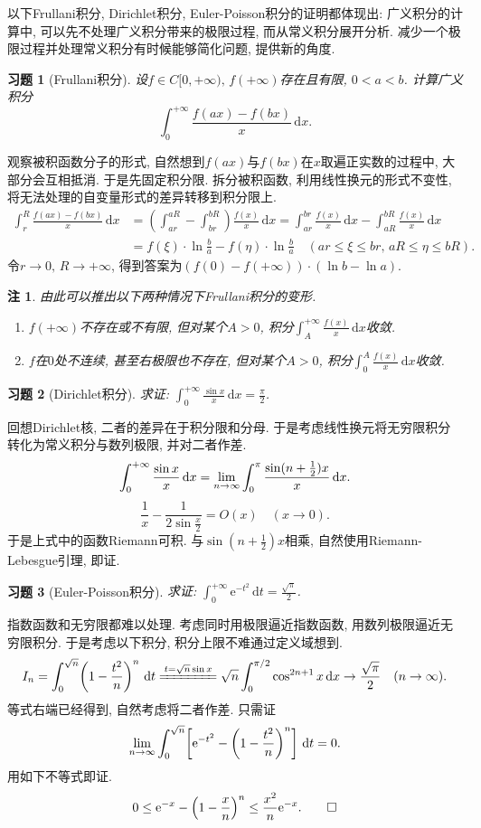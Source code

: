 \documentclass[11pt,a4paper]{ctexart}
\makeatletter
\theoremstyle{thmseries} %
\theoremstyle{exerseries}
\newtheorem{exer}{习题}[section]
\newtheorem*{rem}{注}
\renewenvironment{proof}[1][\proofname]{\par
  \pushQED{\qed}%
  \normalfont \topsep6\p@\@plus6\p@\relax
  \trivlist
  \item[\hskip\labelsep
        \itshape
    #1\@addpunct{}]\ignorespaces
}{%
  \popQED\endtrivlist\@endpefalse
}
\newenvironment{sol}{\begin{proof}[\bfseries\upshape 解\quad]}{\end{proof}}
\newenvironment{pf}{\begin{proof}[\bfseries\upshape 证\quad]}{\end{proof}}
\newcommand{\bra}[1]{\mathopen{}\left(#1\right)}
\newcommand{\sbra}[1]{\mathopen{}\left[#1\right]}
\renewcommand{\d}{\mathrm{d}}
\newcommand{\e}{\mathrm{e}}
\def \nti {\mathnormal{n}\to\infty}
\makeatother
\begin{document}
以下Frullani积分, Dirichlet积分, Euler-Poisson积分的证明都体现出: 广义积分的计算中, 可以先不处理广义积分带来的极限过程, 而从常义积分展开分析. 减少一个极限过程并处理常义积分有时候能够简化问题, 提供新的角度. 
\begin{exer}[Frullani积分]
	设$f\in C[0,+\infty),\,f(+\infty)$存在且有限, $0<a<b$. 计算广义积分
	\[\int_{0}^{+\infty}\frac{f(ax)-f(bx)}{x}\,\d x.\]
\end{exer}
\begin{sol}
	观察被积函数分子的形式, 自然想到$f(ax)$与$f(bx)$在$x$取遍正实数的过程中, 大部分会互相抵消. 于是先固定积分限. 拆分被积函数, 利用线性换元的形式不变性, 将无法处理的自变量形式的差异转移到积分限上. 
	\begin{align*}
		\int_{r}^{R}\frac{f(ax)-f(bx)}{x}\,\d x&=\bra{\int_{ar}^{aR}-\int_{br}^{bR}}\frac{f(x)}{x}\,\d x=\int_{ar}^{br}\frac{f(x)}{x}\,\d x-\int_{aR}^{bR}\frac{f(x)}{x}\,\d x\\
		&=f(\xi)\cdot\ln\frac{b}{a}-f(\eta)\cdot\ln\frac{b}{a}\quad (ar\leq\xi\leq br,\,aR\leq\eta\leq bR).
	\end{align*}
	令$r\to0,\,R\to+\infty$, 得到答案为$\bra{f(0)-f(+\infty)}\cdot(\ln b-\ln a)$. 
\end{sol}
\begin{rem}
	由此可以推出以下两种情况下Frullani积分的变形. 
	\begin{enumerate}
		\item $f(+\infty)$不存在或不有限, 但对某个$A>0$, 积分$\int_{A}^{+\infty}\frac{f(x)}{x}\,\d x$收敛. 
		\item $f$在$0$处不连续, 甚至右极限也不存在, 但对某个$A>0$, 积分$\int_{0}^{A}\frac{f(x)}{x}\,\d x$收敛. 
	\end{enumerate}
\end{rem}

\begin{exer}[Dirichlet积分]
	求证: $\int_{0}^{+\infty}\frac{\sin x}{x}\,\d x=\frac{\pi}{2}$. 
\end{exer}
\begin{pf}
	回想Dirichlet核, 二者的差异在于积分限和分母. 于是考虑线性换元将无穷限积分转化为常义积分与数列极限, 并对二者作差. 
	\[\int_{0}^{+\infty}\frac{\sin x}{x}\,\d x=\lim_{\nti}\int_{0}^{\pi}\frac{\sin(n+\frac{1}{2})x}{x}\,\d x.\]
	\[\frac{1}{x}-\frac{1}{2\sin\frac{x}{2}}=O(x)\quad(x\to0).\]
	于是上式中的函数Riemann可积. 与$\sin(n+\frac{1}{2})x$相乘, 自然使用Riemann-Lebesgue引理, 即证. 
\end{pf}

\begin{exer}[Euler-Poisson积分]
	求证: $\int_{0}^{+\infty}\e^{-t^2}\,\d t=\frac{\sqrt{\pi}}{2}$. 
\end{exer}
\begin{pf}
	指数函数和无穷限都难以处理. 考虑同时用极限逼近指数函数, 用数列极限逼近无穷限积分. 于是考虑以下积分, 积分上限不难通过定义域想到. 
	\[I_n=\int_{0}^{\sqrt{n}}\bra{1-\frac{t^2}{n}}^n\,\d t\xlongequal{t=\sqrt{n}\sin x}\sqrt{n}\int_{0}^{\pi/2}\cos^{2n+1}x\,\d x\to\frac{\sqrt{\pi}}{2}\quad(\nti).\]
	等式右端已经得到, 自然考虑将二者作差. 只需证
	\[\lim_{\nti}\int_{0}^{\sqrt{n}}\sbra{\e^{-t^2}-\bra{1-\frac{t^2}{n}}^n}\,\d t=0.\]
	用如下不等式即证. 
	\[0\leq\e^{-x}-\bra{1-\frac{x}{n}}^n\leq\frac{x^2}{n}\e^{-x}.\qedhere\]
\end{pf}
\end{document}
